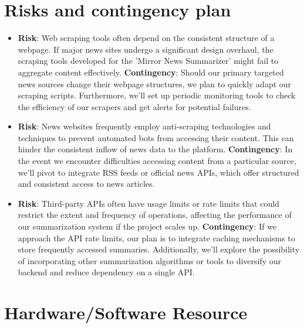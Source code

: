 \documentclass[a4paper]{article}
\begin{document}
\section{Risks and contingency plan}

\begin{itemize}
    \item \textbf{Risk}: Web scraping tools often depend on the consistent structure of a webpage. If major news sites undergo a significant design overhaul, the scraping tools developed for the 'Mirror News Summarizer' might fail to aggregate content effectively.
    \subitem \textbf{Contingency}: Should our primary targeted news sources change their webpage structures, we plan to quickly adapt our scraping scripts. Furthermore, we'll set up periodic monitoring tools to check the efficiency of our scrapers and get alerts for potential failures.
    \item \textbf{Risk}: News websites frequently employ anti-scraping technologies and techniques to prevent automated bots from accessing their content. This can hinder the consistent inflow of news data to the platform.
    \subitem \textbf{Contingency}: In the event we encounter difficulties accessing content from a particular source, we'll pivot to integrate RSS feeds or official news APIs, which offer structured and consistent access to news articles.
    \item \textbf{Risk}: Third-party APIs often have usage limits or rate limits that could restrict the extent and frequency of operations, affecting the performance of our summarization system if the project scales up.
    \subitem \textbf{Contingency}: If we approach the API rate limits, our plan is to integrate caching mechanisms to store frequently accessed summaries. Additionally, we'll explore the possibility of incorporating other summarization algorithms or tools to diversify our backend and reduce dependency on a single API.
\end{itemize}

\section{Hardware/Software Resource}
\end{document}
